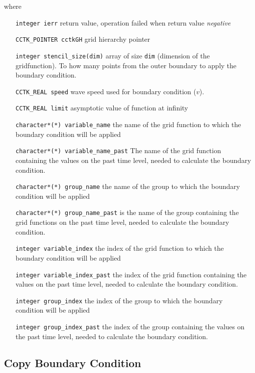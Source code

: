 \documentclass{article}
\begin{document}
where
\begin{itemize}
\item[{\tt integer ierr}] return value, operation failed when return
value {\em negative}
\item[{\tt CCTK\_POINTER cctkGH}] grid hierarchy pointer
\item[{\tt integer stencil\_size(dim)}] array of size {\tt dim}
(dimension of the gridfunction). To how many points from the outer
boundary to apply the boundary condition. 
\item[{\tt CCTK\_REAL speed}] wave speed used for boundary condition ($v$).
	
\item[{\tt CCTK\_REAL limit}] asymptotic value of function at infinity

\item[{\tt character*(*) variable\_name}] the name of the grid function 
	to which the boundary condition will be applied
\item[{\tt character*(*) variable\_name\_past}]  
    The name of the grid function 
    containing the values on the past time level, needed to calculate
    the boundary condition.

\item[{\tt character*(*) group\_name}] the name of the group
	to which the boundary condition will be applied
\item[{\tt character*(*) group\_name\_past}] is the name of the group
    containing the grid functions on the past time level, needed to calculate
    the boundary condition.

\item[{\tt integer variable\_index}] the index of the grid function 
	to which the boundary condition will be applied
\item[{\tt integer variable\_index\_past}] the index of the grid function 
    containing the values on the past time level, needed to calculate
    the boundary condition.

\item[{\tt integer group\_index}] the index of the group
	to which the boundary condition will be applied
\item[{\tt integer group\_index\_past}] the index of the group
    containing the values on the past time level, needed to calculate
    the boundary condition.
\end{itemize}


\subsection{Copy Boundary Condition}
\end{document}
